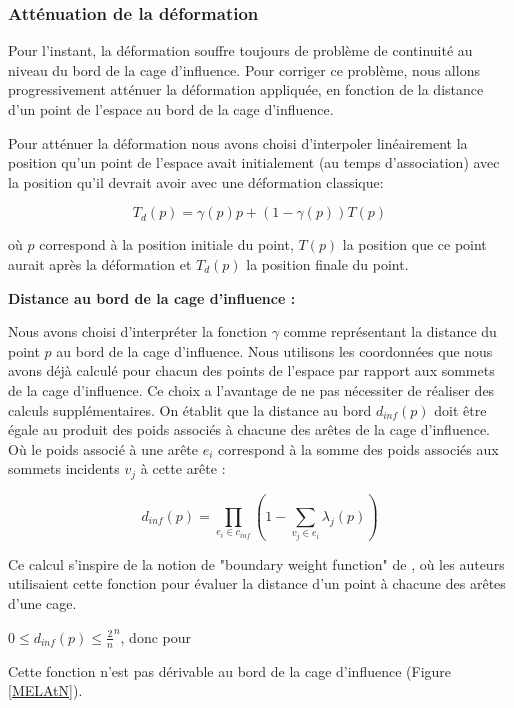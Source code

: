 \subsubsection{Atténuation de la déformation}

Pour l'instant, la déformation souffre toujours de problème de continuité au
niveau du bord de la cage d'influence. Pour corriger ce problème, nous allons
progressivement atténuer la déformation appliquée, en fonction de la distance
d'un point de l'espace au bord de la cage d'influence.

Pour atténuer la déformation nous avons choisi d'interpoler linéairement la
position qu'un point de l'espace avait initialement (au temps d'association)
avec la position qu'il devrait avoir avec une déformation classique:

\begin{equation}
  T_{d}(p) = \gamma(p) p + (1-\gamma(p)) T(p)
\end{equation}

où $p$ correspond à la position initiale du point, $T(p)$ la position que ce
point aurait après la déformation et $T_{d}(p)$ la position finale du point.

\textbf{Distance au bord de la cage d'influence :}

Nous avons choisi d'interpréter la fonction $\gamma$ comme représentant la
distance du point $p$ au bord de la cage d'influence. Nous utilisons les
coordonnées que nous avons déjà calculé pour chacun des points de l'espace par
rapport aux sommets de la cage d'influence. Ce choix a l'avantage de ne pas
nécessiter de réaliser des calculs supplémentaires. On établit que la distance
au bord $d_{inf}(p)$ doit être égale au produit des poids associés à chacune
des arêtes de la cage d'influence. Où le poids associé à une arête $e_i$
correspond à la somme des poids associés aux sommets incidents $v_j$ à cette
arête :

\begin{equation}
  d_{inf}(p) = \prod_{e_i \in c_{inf}} (1 - \sum_{v_j \in e_i} \lambda_j(p))
  \label{MELInf}
\end{equation}

Ce calcul s'inspire de la notion de "boundary weight function" de
\cite{GPCP13}, où les auteurs utilisaient cette fonction pour évaluer la
distance d'un point à chacune des arêtes d'une cage.

$0 \leq d_{inf}(p) \leq \frac{2}{n}^n$, donc pour 

Cette fonction n'est pas dérivable au bord de la cage d'influence (Figure
\ref{MELAtN}).

